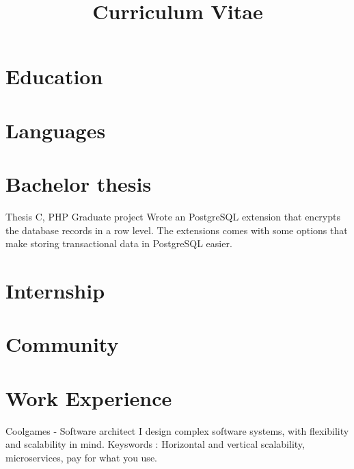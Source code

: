 \documentclass[11pt,a4paper]{moderncv}
\title{Curriculum Vitae}
\begin{document}
\maketitle

\section{Education}

\section{Languages}

\section{Bachelor thesis}
{Thesis}
{C, PHP}
{Graduate project}{}
{
Wrote an PostgreSQL extension that encrypts the database records in a row
level. The extensions comes with some options that make storing transactional
data in PostgreSQL easier.
}

\section{Internship}

\section{Community}

\section{Work Experience}

\vspace*{0.2\baselineskip}
{Coolgames - Software architect}
{}
{}
{}
{
I design complex software systems, with flexibility and scalability in mind.
Keyswords : Horizontal and vertical scalability, microservices, pay for what
you use. 
}
\end{document}
